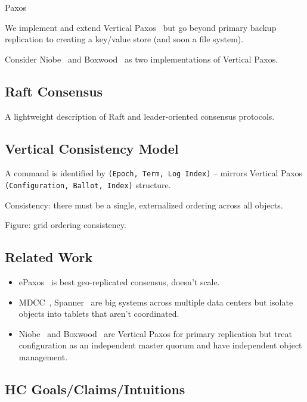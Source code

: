 \documentclass[10pt,twocolumn]{article}
\begin{document}
Paxos~\cite{fast_paxos,camargos_multicoordinated_2007,lamport_generalized_2005,epaxos,spaxos}

We implement and extend Vertical Paxos~\cite{vertical_paxos} but go beyond
primary backup replication to creating a key/value store (and soon a file
system).

Consider Niobe~\cite{niobe} and Boxwood~\cite{boxwood} as two implementations
of Vertical Paxos.

\subsection*{Raft Consensus}

A lightweight description of Raft and leader-oriented consensus protocols.

\subsection*{Vertical Consistency Model}

A command is identified by \texttt{(Epoch, Term, Log Index)} -- mirrors
Vertical Paxos \texttt{(Configuration, Ballot, Index)} structure.

Consistency: there must be a single, externalized ordering across all
objects.

Figure: grid ordering consistency.  

\subsection*{Related Work}

\begin{itemize}
    \item ePaxos~\cite{epaxos} is best geo-replicated consensus, doesn't
    scale.
    \item MDCC~\cite{mdcc}, Spanner~\cite{spanner} are big systems across
    multiple data centers but isolate objects into tablets that aren't
    coordinated. 
    \item Niobe~\cite{niobe} and Boxwood~\cite{boxwood} are Vertical Paxos
    for primary replication but treat configuration as an independent master
    quorum and have independent object management.
\end{itemize}

\subsection*{HC Goals/Claims/Intuitions}
\end{document}
